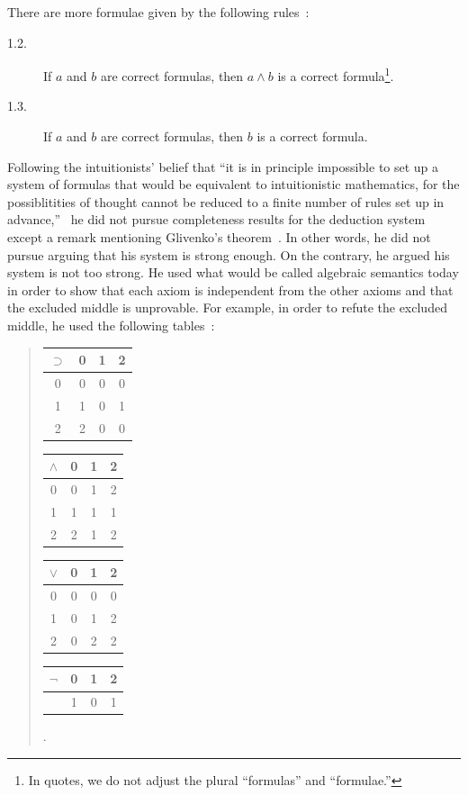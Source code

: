 There are more formulae given by the following rules~\cite{heyting1930}:
\begin{description}
 \item[1.2.] If $a$ and $b$ are correct formulas, then $a\land b$ is a correct
       formula\footnote{In quotes, we do not adjust the plural
      ``formulas'' and ``formulae.'' }.
 \item[1.3.] If $a$ and $b$ are correct formulas, then $b$ is a correct formula.
\end{description}

Following the intuitionists' belief
that ``it is in principle impossible to set up a system of formulas that
would be equivalent to intuitionistic mathematics, for the
possiblitities of thought cannot be reduced to a finite number of rules
set up in advance,''~\citep{heyting1930} he did not pursue completeness
results for the deduction system
except a remark mentioning Glivenko's
theorem~\citep{glivenko0,glivenko1}.
In other words, he did not pursue arguing that his system is strong
enough.
On the contrary, he argued his system is not too strong.
He used what would be called algebraic semantics today
in order to show that
each axiom is independent from the other axioms and that
the excluded middle is unprovable.
For example, in order to refute the excluded middle, he used the
following tables~\citep{heyting1930}:\\
 \begin{quotation}
 \begin{center}
  \begin{tabular}{c|ccc}
   $\supset $& 0  & 1  & 2 \\ \hline
   0 & 0 & 0 & 0 \\
   1 & 1 & 0 & 1 \\
   2 & 2 & 0 & 0
  \end{tabular}
  \hfill
  \begin{tabular}{c|ccc}
   $\wedge $& 0 & 1& 2\\ \hline
   0 & 0 & 1 & 2\\
   1 & 1 & 1 & 1\\
   2 & 2 & 1 & 2\\
  \end{tabular}
  \hfill
  \begin{tabular}{c|ccc}
   $\vee$& 0 & 1 & 2\\ \hline
   0 & 0 & 0 & 0 \\
   1 & 0 & 1 & 2 \\
   2 & 0 & 2 & 2\\
  \end{tabular}
  \hfill
  \begin{tabular}{c|ccc}
   $\neg $& 0 & 1 & 2\\ \hline
   & 1 & 0 & 1\\
  \end{tabular}\enspace.
 \end{center}
 \end{quotation}
